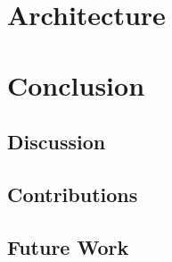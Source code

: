 \documentclass[a4paper, 11pt]{book}
\begin{document}
\chapter{Architecture}



\chapter{Conclusion}

\section{Discussion}


\section{Contributions}


\section{Future Work}







\begin{appendices}
  
  
  
\end{appendices}
\end{document}
